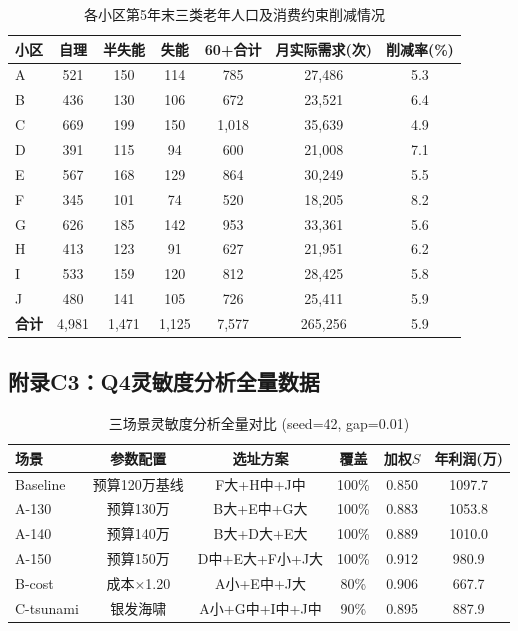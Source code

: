 \documentclass[12pt,a4paper]{ctexart}
\begin{document}
\begin{table}[H]
\centering
\caption{各小区第5年末三类老年人口及消费约束削减情况}
\label{tab:q1_community_detail}
\footnotesize
\begin{tabular}{lcccccc}
\toprule
\textbf{小区} & \textbf{自理} & \textbf{半失能} & \textbf{失能} & \textbf{60+合计} & \textbf{月实际需求(次)} & \textbf{削减率(\%)} \\
\midrule
A & 521 & 150 & 114 & 785 & 27,486 & 5.3 \\
B & 436 & 130 & 106 & 672 & 23,521 & 6.4 \\
C & 669 & 199 & 150 & 1,018 & 35,639 & 4.9 \\
D & 391 & 115 & 94 & 600 & 21,008 & 7.1 \\
E & 567 & 168 & 129 & 864 & 30,249 & 5.5 \\
F & 345 & 101 & 74 & 520 & 18,205 & 8.2 \\
G & 626 & 185 & 142 & 953 & 33,361 & 5.6 \\
H & 413 & 123 & 91 & 627 & 21,951 & 6.2 \\
I & 533 & 159 & 120 & 812 & 28,425 & 5.8 \\
J & 480 & 141 & 105 & 726 & 25,411 & 5.9 \\
\midrule
\textbf{合计} & 4,981 & 1,471 & 1,125 & 7,577 & 265,256 & 5.9 \\
\bottomrule
\end{tabular}
\end{table}

\subsection*{附录C3：Q4灵敏度分析全量数据}

\begin{table}[H]
\centering
\caption{三场景灵敏度分析全量对比 (seed=42, gap=0.01)}
\label{tab:sensitivity_full}
\footnotesize
\begin{tabular}{lccccc}
\toprule
\textbf{场景} & \textbf{参数配置} & \textbf{选址方案} & \textbf{覆盖} & \textbf{加权$S$} & \textbf{年利润(万)} \\
\midrule
Baseline & 预算120万基线 & F大+H中+J中 & 100\% & 0.850 & 1097.7 \\
A-130 & 预算130万 & B大+E中+G大 & 100\% & 0.883 & 1053.8 \\
A-140 & 预算140万 & B大+D大+E大 & 100\% & 0.889 & 1010.0 \\
A-150 & 预算150万 & D中+E大+F小+J大 & 100\% & 0.912 & 980.9 \\
B-cost & 成本$\times$1.20 & A小+E中+J大 & 80\% & 0.906 & 667.7 \\
C-tsunami & 银发海啸 & A小+G中+I中+J中 & 90\% & 0.895 & 887.9 \\
\bottomrule
\end{tabular}
\end{table}
\end{document}
